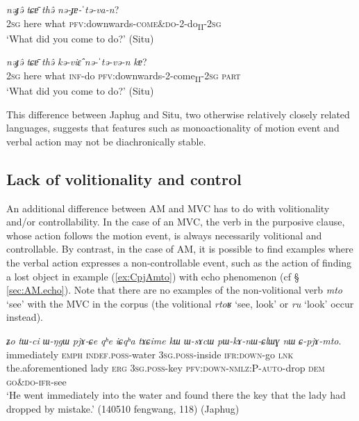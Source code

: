 \documentclass[oneside,a4paper,11pt]{article}
\newcommand{\ipa}[1]{{\phon\textit{#1}}}
\newcommand{\japhug}[2]{\textit{\phon#1} `#2'}
\newcommand{\sens}[1]{‘#1’}
\newcommand{\rouge}[1]{{\color{red}#1}}
\begin{document}
 

\begin{exe}
\ex \label{ex:nEJAtəVan}
\gll
\ipa{nəɟə̂} \ipa{tɕɐ̄} \ipa{thə̂} \ipa{nə-\rouge{ɟɐ}-ˈtə-va-n}? \\
\textsc{2sg} here what  \textsc{pfv}:downwards-\textsc{\rouge{come\&do}}-2-do\textsubscript{II}-\textsc{2sg} \\
\glt  \sens{What did you come to do?} (Situ)
\end{exe}

\begin{exe}
\ex \label{ex:nEtEvEn}
\gll
\ipa{nəɟə̂} \ipa{tɕɐ̄} \ipa{thə̂} \ipa{kə-viɛ̂} \ipa{nə-ˈtə-və-n} \ipa{kɐ}? \\
\textsc{2sg} here what \textsc{inf}-do \textsc{pfv}:downwards-2-come\textsubscript{II}-\textsc{2sg} \textsc{part} \\
\glt  \sens{What did you come to do?} (Situ)
\end{exe}

This difference between Japhug and Situ, two otherwise relatively closely related languages, suggests that features such as monoactionality of motion event and verbal action may not be diachronically stable.

\subsection{Lack of volitionality and control } \label{sec:volitionality}
An additional difference between AM and MVC has to do with volitionality and/or controllability. In the case of an MVC, the verb in the purposive clause, whose action follows the motion event, is always necessarily volitional and controllable. By contrast, in the case of AM, it is possible to find examples where the verbal action expresses a non-controllable event, such as the action of finding a lost object in example (\ref{ex:CpjAmto}) with echo phenomenon (cf § \ref{sec:AM.echo}). Note that there are no examples of the non-volitional verb \japhug{mto}{see} with the MVC in the corpus (the volitional \japhug{rtoʁ}{see, look} or \japhug{ru}{look} occur  instead). 

\begin{exe}
\ex  \label{ex:CpjAmto}
\gll  \ipa{nɯɕɯmɯma}	\ipa{ʑo}	\ipa{tɯ-ci}	\ipa{ɯ-ŋgɯ}	\ipa{pjɤ-ɕe}	\ipa{qʰe}	\ipa{iɕqʰa}	\ipa{tɤɕime}	\ipa{kɯ}	\ipa{ɯ-sɤcɯ}	\ipa{pɯ-kɤ-nɯ-ɕlɯɣ}	\ipa{nɯ}	\ipa{\rouge{ɕ}-pjɤ-mto}. \\
immediately \textsc{emph} \textsc{indef}.\textsc{poss}-water \textsc{3sg}.\textsc{poss}-inside \textsc{ifr}:\textsc{down}-go \textsc{lnk} the.aforementioned lady \textsc{erg} \textsc{3sg}.\textsc{poss}-key \textsc{pfv}:\textsc{down}-\textsc{nmlz}:P-\textsc{auto}-drop \textsc{dem} \rouge{\textsc{go\&do}}-\textsc{ifr}-see \\
\glt `He went immediately into the water and found there the key that the lady had dropped by mistake.' (140510 fengwang, 118) (Japhug)
\end{exe}
\end{document}

